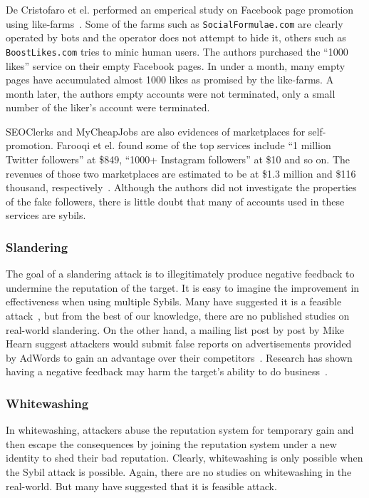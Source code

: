 De Cristofaro et el. performed an emperical study on Facebook page promotion
using like-farms~\cite{de2014paying}. Some of the farms such as
\verb!SocialFormulae.com! are clearly operated by bots and the operator does not
attempt to hide it, others such as \verb!BoostLikes.com! tries to minic human
users. The authors purchased the ``1000 likes'' service on their empty Facebook
pages. In under a month, many empty pages have accumulated almost 1000 likes as
promised by the like-farms. A month later, the authors empty accounts were not
terminated, only a small number of the liker's account were terminated.


SEOClerks and MyCheapJobs are also evidences of marketplaces for self-promotion.
Farooqi et el. found some of the top services include ``1 million Twitter
followers'' at \$849, ``1000+ Instagram followers'' at \$10 and so on. The
revenues of those two marketplaces are estimated to be at \$1.3 million and
\$116 thousand, respectively~\cite{farooqi2015characterizing}. Although the
authors did not investigate the properties of the fake followers, there is
little doubt that many of accounts used in these services are sybils.

\subsubsection{Slandering}
The goal of a slandering attack is to illegitimately produce negative feedback
to undermine the reputation of the target. It is easy to imagine the improvement
in effectiveness when using multiple Sybils. Many have suggested it is a
feasible attack~\cite{hoffman2009survey, koutrouli2012taxonomy}, but from the
best of our knowledge, there are no published studies on real-world slandering.
On the other hand, a mailing list post by post by Mike Hearn suggest attackers
would submit false reports on advertisements provided by AdWords to gain an
advantage over their competitors~\cite{adwords}. Research has shown having a
negative feedback may harm the target's ability to do
business~\cite{ba2002evidence}.


\subsubsection{Whitewashing}
In whitewashing, attackers abuse the reputation system for temporary gain and
then escape the consequences by joining the reputation system under a new
identity to shed their bad reputation. Clearly, whitewashing is only possible
when the Sybil attack is possible. Again, there are no studies on whitewashing
in the real-world. But many have suggested that it is feasible
attack\cite{hoffman2009survey, marti2006taxonomy}.

